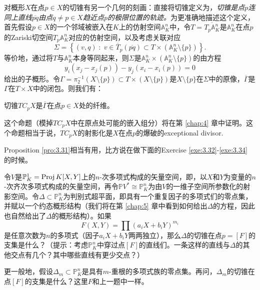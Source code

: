 对概形$X$在点$p\in X$的切锥有另一个几何的刻画：直接将切锥定义为，\textit{切锥是点$p$连同上直线$\overline{pq}$由点$q\neq p\in X$趋近点$p$的极限位置的轨迹。}为更准确地描述这个定义，首先假设$p\in X$的一个邻域被嵌入在$K$上的仿射空间$\mathbb A_K^n$中，令$T=\overline{T_p\mathbb A_K^n}$是$\mathbb A_K^n$在点$p$的Zariski切空间$T_p\mathbb A_K^n$对应的仿射空间，以及考虑关联对应
\[
	\Sigma = \left\{(v,q)\;:\;v\in \overline{T}_p(\overline{pq})\subset T\times (\mathbb A_K^n \setminus \{p\})\right\}.
\] %
等价地，通过将$T$与$\mathbb A_K^n$本身等同起来，则$\Sigma$是$\mathbb A_K^n\times (\mathbb A_K^n \setminus \{p\})$的由方程
\[
	y_i\left(x_j-x_j(p)\right)-y_j\left(x_i-x_i(p)\right)=0
\]
给出的子概形。令$\Gamma=\pi_2^{-1}(X\setminus \{p\})\subset T\times (X\setminus \{p\})$是$X\setminus \{p\}$在$\Sigma$中的原像，$\overline{\Gamma}$是$\Gamma$在$T\times X$中的闭包。则我们有：

\begin{pro}\label{pro:3.31}
切锥$TC_p X$是$\overline{\Gamma}$在点$p\in X$处的纤维。
\end{pro}

这个命题（模掉$TC_p X$中在原点处可能的嵌入组分）将在第 \ref{chap:4} 章中证明。这个命题相当于说，$TC_p X$的射影化是$X$在点$p$的爆破的exceptional divisor. \nottran

Proposition \ref{pro:3.31}相当有用，比方说在做下面的Exercise \ref{exe:3.32}-\ref{exe:3.34} 的时候。

\begin{exe}\label{exe:3.32}
令$V$是$\mathbb P_K^1=\operatorname{Proj} K[X,Y]$上的$n$-次多项式构成的矢量空间，即，以$X$和$Y$为变量的$n$-次齐次多项式构成的矢量空间，再令$\mathbb P V^*\cong \mathbb P_K^n$为由$V$的一维子空间所参数化的射影空间。令$\Delta\subset \mathbb P_K^n$为判别式超平面，即具有一个重复因子的多项式们的零点集，并赋以一个约态概形结构（我们将在第 \ref{chap:5} 章中看到如何给出$\Delta$的方程，因此也自然给出了$\Delta$的概形结构）。如果
\[
	F(X,Y)=\prod (a_i X+b_i Y)^{m_i}
\]
是任意次数为$n$的多项式（因子$a_iX+b_iY$两两独立），那么$\Delta$的切锥在点$p=[F]$的支集是什么？（提示：考虑$\mathbb P_K^n$中穿过点$[F]$的直线们。一条这样的直线与$\Delta$的其他交点有几个？其中哪些直线有更少交点？）
\end{exe}

\begin{exe}\label{exe:3.33}
更一般地，假设$\Delta_m\subset \mathbb P_K^n$是具有$m$-重根的多项式族的零点集。再问，$\Delta_m$的切锥在点$[F]$的支集是什么？这里$F$和上一题中一样。
\end{exe}

